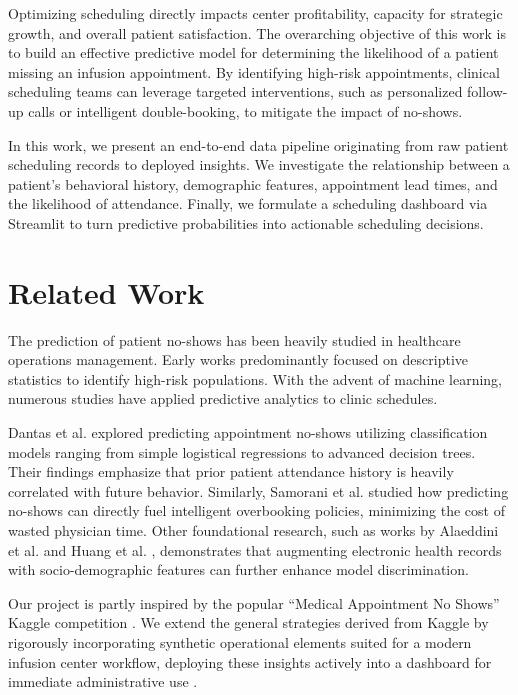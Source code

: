 \documentclass[conference]{IEEEtran}
\begin{document}
Optimizing scheduling directly impacts center profitability, capacity for strategic growth, and overall patient satisfaction. The overarching objective of this work is to build an effective predictive model for determining the likelihood of a patient missing an infusion appointment. By identifying high-risk appointments, clinical scheduling teams can leverage targeted interventions, such as personalized follow-up calls or intelligent double-booking, to mitigate the impact of no-shows. 

In this work, we present an end-to-end data pipeline originating from raw patient scheduling records to deployed insights. We investigate the relationship between a patient's behavioral history, demographic features, appointment lead times, and the likelihood of attendance. Finally, we formulate a scheduling dashboard via Streamlit to turn predictive probabilities into actionable scheduling decisions.

\section{Related Work}
The prediction of patient no-shows has been heavily studied in healthcare operations management. Early works predominantly focused on descriptive statistics to identify high-risk populations. With the advent of machine learning, numerous studies have applied predictive analytics to clinic schedules.

Dantas et al. \cite{dantas2018predicting} explored predicting appointment no-shows utilizing classification models ranging from simple logistical regressions to advanced decision trees. Their findings emphasize that prior patient attendance history is heavily correlated with future behavior. Similarly, Samorani et al. \cite{samorani2020overbooking} studied how predicting no-shows can directly fuel intelligent overbooking policies, minimizing the cost of wasted physician time. Other foundational research, such as works by Alaeddini et al. \cite{alaeddini2011predicting} and Huang et al. \cite{huang2014patient}, demonstrates that augmenting electronic health records with socio-demographic features can further enhance model discrimination.

Our project is partly inspired by the popular ``Medical Appointment No Shows'' Kaggle competition \cite{hoppen2016medical}. We extend the general strategies derived from Kaggle by rigorously incorporating synthetic operational elements suited for a modern infusion center workflow, deploying these insights actively into a dashboard for immediate administrative use \cite{streamlit}.
\end{document}
